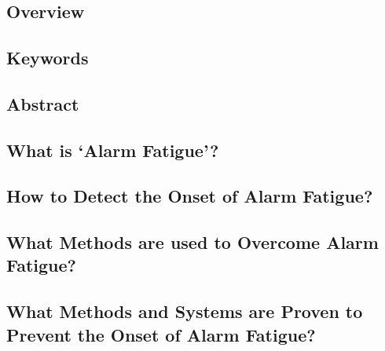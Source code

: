 \chapter{}

\section{Overview}

\section{Keywords}

\section{Abstract}

\section{What is `Alarm Fatigue'?}

\section{How to Detect the Onset of Alarm Fatigue?}

\section{What Methods are used to Overcome Alarm Fatigue?}

\section{What Methods and Systems are Proven to Prevent the Onset of Alarm Fatigue?}

